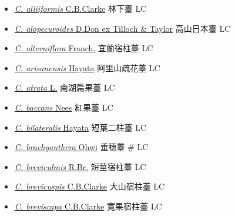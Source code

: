 \begin{itemize}
  \begin{itemize}
        \item[] \href{http://www.theplantlist.org/tpl1.1/search?q=Carex+alliiformis}{\textit{C. alliiformis} C.B.Clarke}   林下薹   LC
        \item[] \href{http://www.theplantlist.org/tpl1.1/search?q=Carex+alopecuroides}{\textit{C. alopecuroides} D.Don ex Tilloch \& Taylor}   高山日本薹   LC
        \item[] \href{http://www.theplantlist.org/tpl1.1/search?q=Carex+alterniflora}{\textit{C. alterniflora} Franch.}   宜蘭宿柱薹   LC
        \item[] \href{http://www.theplantlist.org/tpl1.1/search?q=Carex+arisanensis}{\textit{C. arisanensis} Hayata}   阿里山疏花薹   LC
        \item[] \href{http://www.theplantlist.org/tpl1.1/search?q=Carex+atrata}{\textit{C. atrata} L.}   南湖扁果薹   LC
        \item[] \href{http://www.theplantlist.org/tpl1.1/search?q=Carex+baccans}{\textit{C. baccans} Nees}   紅果薹   LC
        \item[] \href{http://www.theplantlist.org/tpl1.1/search?q=Carex+bilateralis}{\textit{C. bilateralis} Hayata}   短葉二柱薹   LC
        \item[] \href{http://www.theplantlist.org/tpl1.1/search?q=Carex+brachyanthera}{\textit{C. brachyanthera} Ohwi}   垂穗薹  \# LC
        \item[] \href{http://www.theplantlist.org/tpl1.1/search?q=Carex+breviculmis}{\textit{C. breviculmis} R.Br.}   短莖宿柱薹   LC
        \item[] \href{http://www.theplantlist.org/tpl1.1/search?q=Carex+brevicuspis}{\textit{C. brevicuspis} C.B.Clarke}   大山宿柱薹   LC
        \item[] \href{http://www.theplantlist.org/tpl1.1/search?q=Carex+breviscapa}{\textit{C. breviscapa} C.B.Clarke}   寬果宿柱薹   LC

\end{itemize}
\end{itemize}
